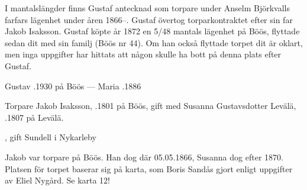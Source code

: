 I mantalslängder finns Gustaf antecknad som torpare under Anselm Björkvalls farfars lägenhet under åren 1866--. Gustaf övertog torparkontraktet efter sin far Jakob Isaksson. Gustaf köpte år 1872 en 5/48 mantals lägenhet på Böös, flyttade sedan dit med sin familj (Böös nr 44). Om han också flyttade torpet dit är oklart, men inga uppgifter har hittats att någon skulle ha bott på denna plats efter Gustaf.

Gustav .1930 på Böös  ---  Maria .1886


Torpare Jakob Isaksson, .1801 på Böös, gift med Susanna Gustavsdotter Levälä, .1807 på Levälä.
\begin{jhchildren}
  \item {}, gift Sundell i Nykarleby
  \item {}
  \item {}
  \item {}
\end{jhchildren}
Jakob var torpare på Böös. Han dog där 05.05.1866, Susanna dog efter 1870. Platsen för torpet baserar sig på karta, som Boris Sandås gjort enligt uppgifter av Eliel Nygård. Se karta 12!
